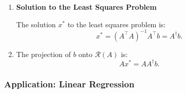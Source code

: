\begin{intuition}
\begin{enumerate}
        
        \item \textbf{Solution to the Least Squares Problem}
        
        The solution \(x^*\) to the least squares problem is:
        \[
        x^* = (A^\top A)^{-1} A^\top b = A^\dagger b.
        \]
        
        \item The projection of \(b\) onto \(\mathcal{R}(A)\) is:
        \[
        A x^* = A A^\dagger b.
        \]
    \end{enumerate}

\end{intuition}

\subsubsection{Application: Linear Regression}
